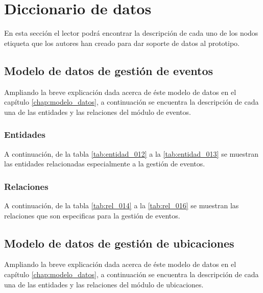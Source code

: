 \chapter{Diccionario de datos}
\label{app:diccionario_datos}

En esta sección el lector podrá encontrar la descripción de cada uno de los nodos etiqueta que los autores han creado para dar soporte de datos al prototipo.

\section{Modelo de datos de gestión de eventos}
Ampliando la breve explicación dada acerca de éste modelo de datos en el capítulo \ref{chap:modelo_datos}, a continuación se encuentra la descripción de cada una de las entidades y las relaciones del módulo de eventos.

\subsection{Entidades}
A continuación, de la tabla \ref{tab:entidad_012} a la \ref{tab:entidad_013} se muestran las entidades relacionadas especialmente a la gestión de eventos.

\clearpage



\subsection{Relaciones}
A continuación, de la tabla \ref{tab:rel_014} a la \ref{tab:rel_016} se muestran las relaciones que son especificas para la gestión de eventos.

\clearpage




\section{Modelo de datos de gestión de ubicaciones}
Ampliando la breve explicación dada acerca de éste modelo de datos en el capítulo \ref{chap:modelo_datos}, a continuación se encuentra la descripción de cada una de las entidades y las relaciones del módulo de ubicaciones.

